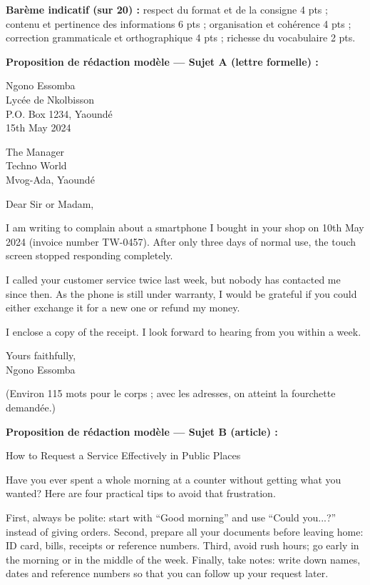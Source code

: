 \documentclass[11pt]{article}
\begin{document}
\begin{corrige}
\textbf{Barème indicatif (sur 20) :} respect du format et de la consigne 4 pts ; contenu et pertinence des informations 6 pts ; organisation et cohérence 4 pts ; correction grammaticale et orthographique 4 pts ; richesse du vocabulaire 2 pts.

\textbf{Proposition de rédaction modèle — Sujet A (lettre formelle) :}
\begin{textebox}
Ngono Essomba\\
Lycée de Nkolbisson\\
P.O. Box 1234, Yaoundé\\
15th May 2024

The Manager\\
Techno World\\
Mvog-Ada, Yaoundé

Dear Sir or Madam,

I am writing to complain about a smartphone I bought in your shop on 10th May 2024 (invoice number TW-0457). After only three days of normal use, the touch screen stopped responding completely.

I called your customer service twice last week, but nobody has contacted me since then. As the phone is still under warranty, I would be grateful if you could either exchange it for a new one or refund my money.

I enclose a copy of the receipt. I look forward to hearing from you within a week.

Yours faithfully,\\
Ngono Essomba
\end{textebox}
(Environ 115 mots pour le corps ; avec les adresses, on atteint la fourchette demandée.)

\textbf{Proposition de rédaction modèle — Sujet B (article) :}
\begin{textebox}
How to Request a Service Effectively in Public Places

Have you ever spent a whole morning at a counter without getting what you wanted? Here are four practical tips to avoid that frustration.

First, always be polite: start with “Good morning” and use “Could you...?” instead of giving orders. Second, prepare all your documents before leaving home: ID card, bills, receipts or reference numbers. Third, avoid rush hours; go early in the morning or in the middle of the week. Finally, take notes: write down names, dates and reference numbers so that you can follow up your request later.


\end{textebox}
\end{corrige}
\end{document}
